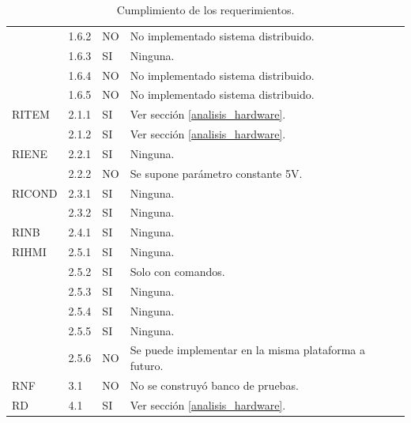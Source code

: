 \begin{table}[h!]
\begin{flushleft}
\begin{tabular}{|m{2.6cm}|m{1.5cm}|m{1.5cm}|m{6.8cm}|}
\multicolumn{1}{|l|}{} & { 1.6.2 } & { NO } & { No implementado sistema distribuido. }\\ \cline{ 2- 4} 
\multicolumn{1}{|l|}{} & { 1.6.3 } & { SI } & { Ninguna. }\\ \cline{ 2- 4} 
\multicolumn{1}{|l|}{} & { 1.6.4 } & { NO } & { No implementado sistema distribuido. }\\ \cline{ 2- 4} 
\multicolumn{1}{|l|}{} & { 1.6.5 } & { NO } & { No implementado sistema distribuido. }\\ \hline 
\multicolumn{1}{|l|}{RITEM} & { 2.1.1 } & { SI } & { Ver sección \ref{analisis_hardware}. }\\ \cline{ 2- 4} 
\multicolumn{1}{|l|}{} & { 2.1.2 } & { SI } & { Ver sección \ref{analisis_hardware}. }\\ \hline 
\multicolumn{1}{|l|}{RIENE} & { 2.2.1 } & { SI } & { Ninguna. }\\ \cline{ 2- 4} 
\multicolumn{1}{|l|}{} & { 2.2.2 } & { NO } & { Se supone parámetro constante 5V. }\\ \hline
\multicolumn{1}{|l|}{RICOND} & { 2.3.1 } & { SI } & { Ninguna. }\\ \cline{ 2- 4} 
\multicolumn{1}{|l|}{} & { 2.3.2 } & { SI } & { Ninguna. }\\ \hline
\multicolumn{1}{|l|}{RINB} & { 2.4.1 } & { SI } & { Ninguna. }\\ \hline
\multicolumn{1}{|l|}{RIHMI} & { 2.5.1 } & { SI } & { Ninguna. }\\ \cline{ 2- 4} 
\multicolumn{1}{|l|}{} & { 2.5.2 } & { SI } & { Solo con comandos. }\\ \cline{ 2- 4} 
\multicolumn{1}{|l|}{} & { 2.5.3 } & { SI } & { Ninguna. }\\ \cline{ 2- 4} 
\multicolumn{1}{|l|}{} & { 2.5.4 } & { SI } & { Ninguna. }\\ \cline{ 2- 4} 
\multicolumn{1}{|l|}{} & { 2.5.5 } & { SI } & { Ninguna. }\\ \cline{ 2- 4} 
\multicolumn{1}{|l|}{} & { 2.5.6 } & { NO } & { Se puede implementar en la misma plataforma a futuro. }\\ \hline
\multicolumn{1}{|l|}{RNF} & { 3.1 } & { NO } & { No se construyó banco de pruebas. }\\ \hline 
\multicolumn{1}{|l|}{RD} & { 4.1 } & { SI } & { Ver sección \ref{analisis_hardware}.}\\ \hline 
\end{tabular}
\end{flushleft}
\caption{ Cumplimiento de los requerimientos.}
\label{tablas_cumplimiento_req}
\end{table}

